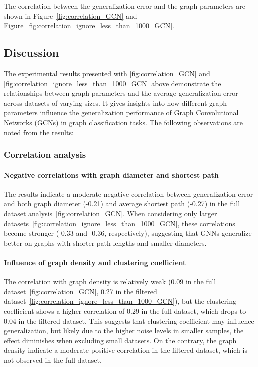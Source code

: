 The correlation between the generalization error and the graph parameters are shown in Figure~\ref{fig:correlation_GCN} and Figure~\ref{fig:correlation_ignore_less_than_1000_GCN}.


\subsection{Discussion}

The experimental results presented with \ref{fig:correlation_GCN} and \ref{fig:correlation_ignore_less_than_1000_GCN}  above demonstrate the relationships between graph parameters and the average generalization error across datasets of varying sizes. It gives insights into how different graph parameters influence the generalization performance of Graph Convolutional Networks (GCNs) in graph classification tasks. The following observations are noted from the results:

\subsubsection{Correlation analysis}

\paragraph{Negative correlations with graph diameter and shortest path}
The results indicate a moderate negative correlation between generalization error and both graph diameter (-0.21) and average shortest path (-0.27) in the full dataset analysis~\ref{fig:correlation_GCN}. When considering only larger datasets~\ref{fig:correlation_ignore_less_than_1000_GCN}, these correlations become stronger (-0.33 and -0.36, respectively), suggesting that GNNs generalize better on graphs with shorter path lengths and smaller diameters. 

\paragraph{Influence of graph density and clustering coefficient}
The correlation with graph density is relatively weak (0.09 in the full dataset~\ref{fig:correlation_GCN}, 0.27 in the filtered dataset~\ref{fig:correlation_ignore_less_than_1000_GCN}), but the clustering coefficient shows a higher correlation of 0.29 in the full dataset, which drops to 0.04 in the filtered dataset. This suggests that clustering coefficient may influence generalization, but likely due to the higher noise levels in smaller samples, the effect diminishes when excluding small datasets. On the contrary, the graph density indicate a moderate positive correlation in the filtered dataset, which is not observed in the full dataset.


